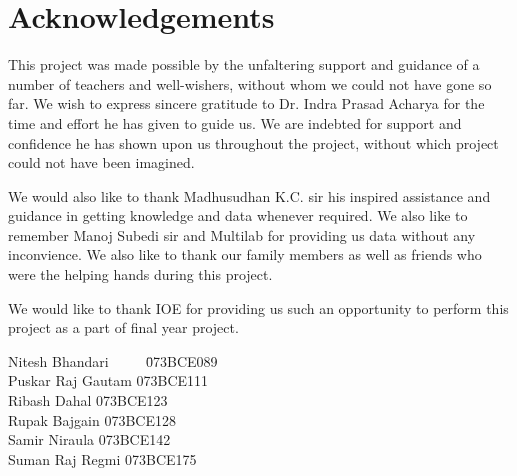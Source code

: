 \chapter*{Acknowledgements}
This project was made possible by the unfaltering support and guidance of a number of teachers and well-wishers, without whom we could not have gone so far. We wish to express sincere gratitude to Dr. Indra Prasad Acharya for the time and effort he has given to guide us. We are indebted for support and confidence he has shown upon us throughout the project, without which project could not have been imagined.

We would also like to thank Madhusudhan K.C. sir his inspired assistance and guidance in getting knowledge and data whenever required. We also like to remember Manoj Subedi sir and Multilab for providing us data without any inconvience. We also like to thank our family members as well as friends who were the helping hands during this project.

We would like to thank IOE for providing us such an opportunity to perform this project as a part of final year project.

\begin{flushright}
\begin{minipage}[t]{0.48\linewidth}
	\vspace{0pt}
	 \begin{tabbing}
		Nitesh Bhandari ~~~~ \=  073BCE089\\
		Puskar Raj Gautam \>  073BCE111\\
		Ribash Dahal \>  073BCE123\\
		Rupak Bajgain \> 073BCE128\\
		Samir Niraula \> 073BCE142\\
		Suman Raj Regmi \> 073BCE175
	\end{tabbing}
\end{minipage}
\end{flushright}